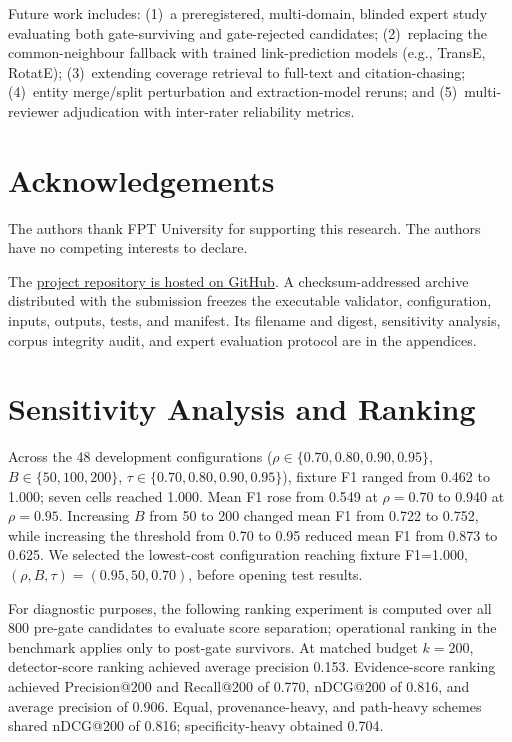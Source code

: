 \documentclass[conference, onecolumn]{IEEEtran}
\begin{document}
Future work includes: (1)~a preregistered, multi-domain, blinded expert study evaluating both gate-surviving and gate-rejected candidates; (2)~replacing the common-neighbour fallback with trained link-prediction models (e.g., TransE, RotatE); (3)~extending coverage retrieval to full-text and citation-chasing; (4)~entity merge/split perturbation and extraction-model reruns; and (5)~multi-reviewer adjudication with inter-rater reliability metrics.

\section*{Acknowledgements}
The authors thank FPT University for supporting this research. The authors have no competing interests to declare.

The \href{https://github.com/Khoa-Hoa-Technology-Solution-Company/research-paper-gap}{project repository is hosted on GitHub}. A checksum-addressed archive distributed with the submission freezes the executable validator, configuration, inputs, outputs, tests, and manifest. Its filename and digest, sensitivity analysis, corpus integrity audit, and expert evaluation protocol are in the appendices.

\FloatBarrier



\appendices

\section{Sensitivity Analysis and Ranking}
\label{app:sensitivity}

Across the 48 development configurations ($\rho\in\{0.70,0.80,0.90,0.95\}$, $B\in\{50,100,200\}$, $\tau\in\{0.70,0.80,0.90,0.95\}$), fixture F1 ranged from 0.462 to 1.000; seven cells reached 1.000. Mean F1 rose from 0.549 at $\rho=0.70$ to 0.940 at $\rho=0.95$. Increasing $B$ from 50 to 200 changed mean F1 from 0.722 to 0.752, while increasing the threshold from 0.70 to 0.95 reduced mean F1 from 0.873 to 0.625. We selected the lowest-cost configuration reaching fixture F1=1.000, $(\rho,B,\tau)=(0.95,50,0.70)$, before opening test results.

For diagnostic purposes, the following ranking experiment is computed over all 800 pre-gate candidates to evaluate score separation; operational ranking in the benchmark applies only to post-gate survivors. At matched budget $k=200$, detector-score ranking achieved average precision 0.153. Evidence-score ranking achieved Precision@200 and Recall@200 of 0.770, nDCG@200 of 0.816, and average precision of 0.906. Equal, provenance-heavy, and path-heavy schemes shared nDCG@200 of 0.816; specificity-heavy obtained 0.704.
\end{document}
